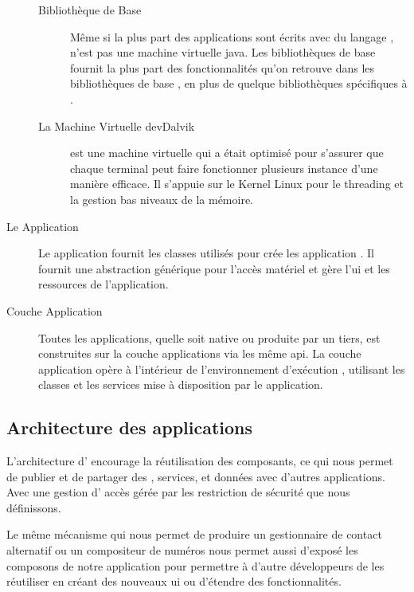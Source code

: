 \begin{description}
\begin{description}
\item [Bibliothèque de Base]

Même si la plus part des applications \android{} sont écrits avec du langage
,  n'est pas une machine virtuelle java. Les bibliothèques
\android{} de base fournit la plus part des fonctionnalités qu'on retrouve
dans les bibliothèques de base , en plus de quelque bibliothèques
spécifiques à \android{}.

\item [La Machine Virtuelle dev{Dalvik}]

 est une machine virtuelle qui a était optimisé pour
s'assurer que chaque terminal peut faire fonctionner plusieurs instance
d'une manière efficace. Il s’appuie sur le Kernel Linux pour le
threading et la gestion bas niveaux de la mémoire.

\end{description}

\item [Le \en{Framework} Application]

Le  application fournit les classes utilisés pour crée les application \android{}. Il fournit une abstraction générique pour l’accès matériel et gère l'\gls{ui} et les ressources de l'application.

\item [Couche Application]

Toutes les applications, quelle soit native ou produite par un tiers, est
construites sur la couche applications via les même \gls{api}. La couche
application opère à l'intérieur de l'environnement d’exécution \android{},
utilisant les classes et les services mise à disposition par le 
application.

\end{description}

\subsection[Architecture des applications \android{}]{Architecture des applications \android{}\cite{pa4ad:chptr1}}

L'architecture d'\android{} encourage la réutilisation des composants, ce qui nous permet de publier et de partager des , services, et données avec d'autres applications. Avec une gestion d' accès gérée par les restriction de sécurité que nous définissons.

Le même mécanisme qui nous permet de produire un gestionnaire de contact alternatif ou un compositeur de numéros nous permet aussi d'exposé les composons de notre application pour permettre à d'autre développeurs de les réutiliser en créant des nouveaux \gls{ui} ou d’étendre des fonctionnalités.

